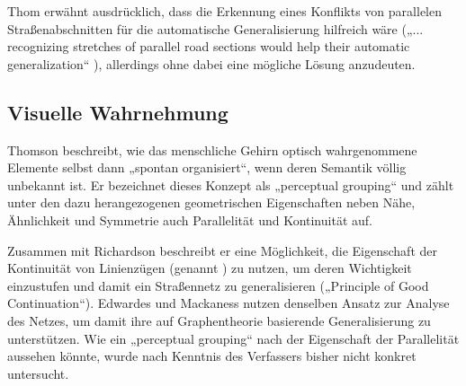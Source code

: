 \documentclass[../main/thesis.tex]{subfiles}
\begin{document}

Thom erwähnt ausdrücklich, dass die Erkennung eines Konflikts von parallelen Straßenabschnitten für die automatische Generalisierung hilfreich wäre („... recognizing stretches of parallel road sections would help their automatic generalization“ ), allerdings ohne dabei eine mögliche Lösung anzudeuten.


\subsection{Visuelle Wahrnehmung}


Thomson beschreibt, wie das menschliche Gehirn optisch wahrgenommene Elemente selbst dann „spontan organisiert“, wenn deren Semantik völlig unbekannt ist.
Er bezeichnet dieses Konzept als „perceptual grouping“ und zählt unter den dazu herangezogenen geometrischen Eigenschaften neben Nähe, Ähnlichkeit und Symmetrie auch Parallelität und Kontinuität auf. 


Zusammen mit Richardson beschreibt er eine Möglichkeit, die Eigenschaft der Kontinuität von Linienzügen (genannt ) zu nutzen, um deren Wichtigkeit einzustufen und damit ein Straßennetz zu generalisieren („Principle of Good Continuation“). 
Edwardes und Mackaness nutzen denselben Ansatz zur Analyse des Netzes, um damit ihre auf Graphentheorie basierende Generalisierung zu unterstützen. 
Wie ein „perceptual grouping“ nach der Eigenschaft der Parallelität aussehen könnte, wurde nach Kenntnis des Verfassers bisher nicht konkret untersucht.
\end{document}

